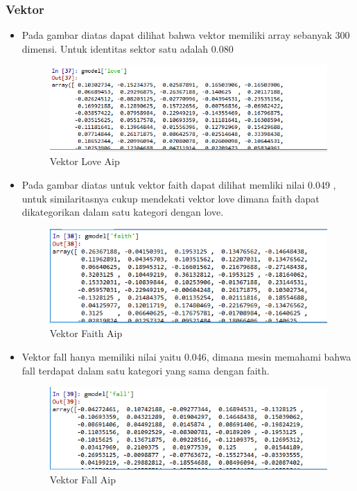\subsubsection{Vektor}
\begin{itemize}
\item Pada gambar diatas dapat dilihat bahwa vektor memiliki array sebanyak 300 dimensi. Untuk identitas sektor satu adalah 0.080
\begin{figure}[ht]
\centering
\includegraphics[scale=0.5]{figures/AIP/e4.PNG}
\caption{Vektor Love Aip}
\label{Praktek}
\end{figure}


\item Pada gambar diatas untuk vektor faith dapat dilihat memliki nilai 0.049 , untuk similaritasnya cukup mendekati vektor love dimana faith dapat dikategorikan dalam satu kategori dengan love.
\begin{figure}[ht]
\centering
\includegraphics[scale=0.5]{figures/AIP/e5.PNG}
\caption{Vektor Faith Aip}
\label{Praktek}
\end{figure}


\item Vektor fall hanya memiliki nilai yaitu 0.046, dimana mesin memahami bahwa fall terdapat dalam satu kategori yang sama dengan  faith.
\begin{figure}[ht]
\centering
\includegraphics[scale=0.5]{figures/AIP/e6.PNG}
\caption{Vektor Fall Aip}
\label{Praktek}
\end{figure}



\end{itemize}

